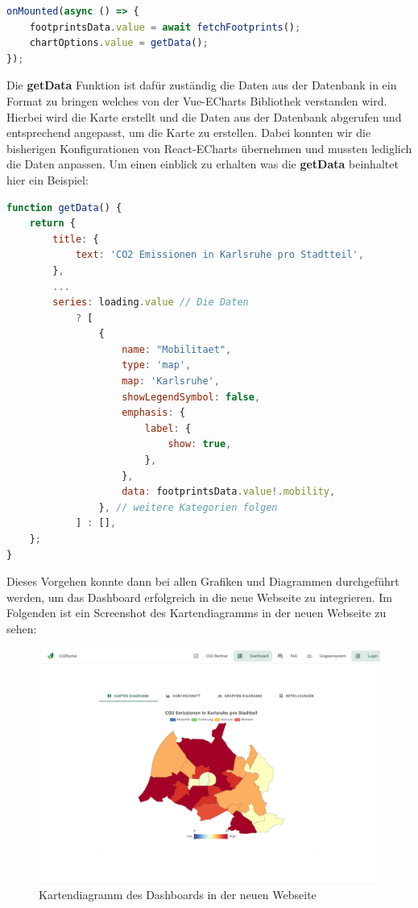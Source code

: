 \begin{lstlisting}[language={JavaScript}, caption={Laden der Fußabdrücke und erstellen der Diagramm Daten und Konfiguration}]
onMounted(async () => {
    footprintsData.value = await fetchFootprints();
    chartOptions.value = getData();
});
\end{lstlisting}

Die \textbf{getData} Funktion ist dafür zuständig die Daten aus der Datenbank in ein Format zu bringen welches von der Vue-ECharts Bibliothek verstanden wird. Hierbei wird die Karte erstellt und die Daten aus der Datenbank abgerufen und entsprechend angepasst, um die Karte zu erstellen. Dabei konnten wir die bisherigen Konfigurationen von React-ECharts übernehmen und mussten lediglich die Daten anpassen. Um einen einblick zu erhalten was die \textbf{getData} beinhaltet hier ein Beispiel:

\begin{lstlisting}[language={JavaScript}, caption={Beispiel Konfiguration für ECharts Diagramme}]
function getData() {
    return {
        title: {
            text: 'CO2 Emissionen in Karlsruhe pro Stadtteil',
        },
        ...
        series: loading.value // Die Daten
            ? [
                {
                    name: "Mobilitaet",
                    type: 'map',
                    map: 'Karlsruhe',
                    showLegendSymbol: false,
                    emphasis: {
                        label: {
                            show: true,
                        },
                    },
                    data: footprintsData.value!.mobility,
                }, // weitere Kategorien folgen
            ] : [],
    };
}
\end{lstlisting}

Dieses Vorgehen konnte dann bei allen Grafiken und Diagrammen durchgeführt werden, um das Dashboard erfolgreich in die neue Webseite zu integrieren. Im Folgenden ist ein Screenshot des Kartendiagramms in der neuen Webseite zu sehen:

\begin{figure}[H]
    \centering
    \includegraphics[width=1\textwidth]{images/06/Dashboard-Design.jpeg}
    \caption{Kartendiagramm des Dashboards in der neuen Webseite}
    \label{fig:new-co2runter-dashboard-design}
\end{figure}

